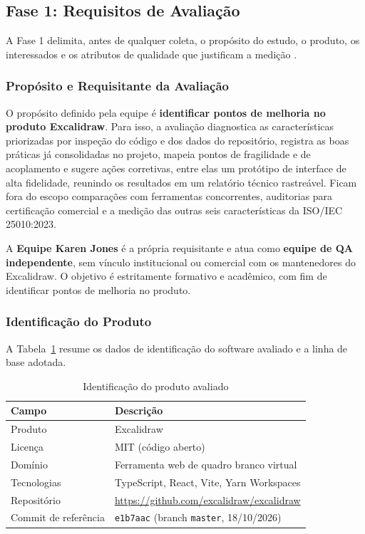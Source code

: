 \documentclass[12pt]{article}
\begin{document}
\subsection{Fase 1: Requisitos de Avaliação}
\label{sec:fase1}
\label{subsec:fase1}

A Fase 1 delimita, antes de qualquer coleta, o propósito do estudo, o produto, os interessados e os atributos de qualidade que justificam a medição \cite{iso25040}.

\subsubsection{Propósito e Requisitante da Avaliação}

O propósito definido pela equipe é \textbf{identificar pontos de melhoria no produto Excalidraw}. Para isso, a avaliação diagnostica as características priorizadas por inspeção do código e dos dados do repositório, registra as boas práticas já consolidadas no projeto, mapeia pontos de fragilidade e de acoplamento e sugere ações corretivas, entre elas um protótipo de interface de alta fidelidade, reunindo os resultados em um relatório técnico rastreável. Ficam fora do escopo comparações com ferramentas concorrentes, auditorias para certificação comercial e a medição das outras seis características da ISO/IEC 25010:2023.

A \textbf{Equipe Karen Jones} é a própria requisitante e atua como \textbf{equipe de QA independente}, sem vínculo institucional ou comercial com os mantenedores do Excalidraw. O objetivo é estritamente formativo e acadêmico, com fim de identificar pontos de melhoria no produto.

\subsubsection{Identificação do Produto}

A Tabela~\ref{tab:produto} resume os dados de identificação do software avaliado e a linha de base adotada.

\begin{table}[!ht]
\centering
\caption{Identificação do produto avaliado}
\label{tab:produto}
\vspace{4pt}
\small
\begin{tabular}{ll}
\toprule
\textbf{Campo} & \textbf{Descrição} \\
\midrule
Produto & Excalidraw \\
Licença & MIT (código aberto) \\
Domínio & Ferramenta web de quadro branco virtual \\
Tecnologias & TypeScript, React, Vite, Yarn Workspaces \\
Repositório & \url{https://github.com/excalidraw/excalidraw} \\
Commit de referência & \texttt{e1b7aac} (branch \texttt{master}, 18/10/2026) \\
\bottomrule
\end{tabular}
\end{table}
\end{document}
